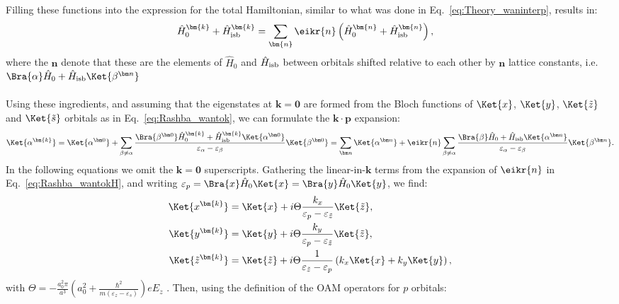 Filling these functions into the expression for the total Hamiltonian, similar to what was done in Eq.~\eqref{eq:Theory_waninterp}, results in:
\begin{align}
	\label{eq:Rashba_wantokH}
	\hat{H}_0^{\bm{k}} + \hat{H}_{\rm isb}^{\bm{k}} &= \sum_{\bm{n}} \eikr{n} \left(\hat{H}_0^{\bm{n}} + \hat{H}_{\rm isb}^{\bm{n}}\right),
\end{align}
where the $\bm n$ denote that these are the elements of $\hat{H}_0$ and $\hat{H}_{\rm isb}$ between orbitals shifted relative to each other by $\bm n$ lattice constants, i.e. $\Bra{\alpha} \hat H_0 + \hat H_{\rm isb} \Ket{\beta^{\bm n}}$
\\\\
Using these ingredients, and assuming that the eigenstates at $\bm k = \bm 0$ are formed from the Bloch functions of $\Ket{x}$, $\Ket{y}$, $\Ket{\tilde{z}}$ and $\Ket{\tilde{s}}$ orbitals as in Eq.~\eqref{eq:Rashba_wantok}, we can formulate the $\bm k \cdot \bm p$ expansion:
\begin{equation}
	\label{eq:Rashba_kdotp}
	\Ket{\alpha^{\bm{k}}}=\Ket{\alpha^{\bm 0}} + \sum_{\beta \neq \alpha} \frac{\Bra{\beta^{\bm 0}} \hat{H}_0^{\bm{k}} + \hat{H}_{\rm isb}^{\bm{k}} \Ket{\alpha^{\bm 0}}}{\varepsilon_{\alpha} - \varepsilon_{\beta}} \Ket{\beta^{\bm 0}} = \sum_{\bm n} \Ket{\alpha^{\bm n}} + \eikr{n} \sum_{\beta \neq \alpha} \frac{\Bra{\beta} \hat{H}_0 + \hat{H}_{\rm isb} \Ket{\alpha^{\bm n}}}{\varepsilon_{\alpha} - \varepsilon_{\beta}} \Ket{\beta^{\bm n}}.
\end{equation}
In the following equations we omit the $\bm{k}=\bm 0$ superscripts.
Gathering the linear-in-$\bm k$ terms from the expansion of $\eikr{n}$ in Eq.~\eqref{eq:Rashba_wantokH}, and writing $\varepsilon_p = \Bra{x} \hat{H}_0 \Ket{x} = \Bra{y} \hat{H}_0 \Ket{y}$, we find:
\begin{align}
	\Ket{x^{\bm{k}}} &= \Ket{x} + i \Theta \frac{k_x}{\varepsilon_p - \varepsilon_{\tilde{z}}}\Ket{\tilde{z}}, \\
	\Ket{y^{\bm{k}}} &= \Ket{y} + i \Theta \frac{k_y}{\varepsilon_p - \varepsilon_{\tilde{z}}}\Ket{\tilde{z}},\\
	\Ket{\tilde{z}^{\bm{k}}} &= \Ket{\tilde{z}} + i \Theta \frac{1}{\varepsilon_{\tilde{z}} - \varepsilon_p} \left(k_x\Ket{x} + k_y\Ket{y}\right),
\end{align}
with $\Theta = -\frac{a_0^2 \pi}{a^3}\left(a_0^2 + \frac{\hbar^2}{m(\varepsilon_z - \varepsilon_s)}\right) e E_z$ .
Then, using the definition of the OAM operators for $p$ orbitals:
